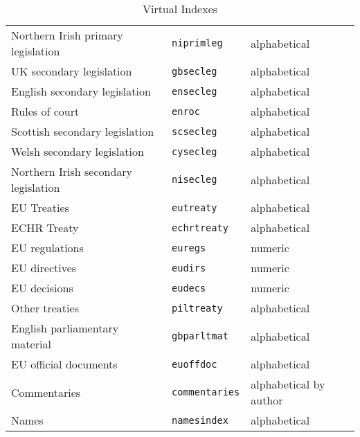 \documentclass[a4paper,
               11pt,
	       DIV=1,			   
	       footinclude=false]
	      {scrartcl}
\begin{document}
\begin{table}
\begin{tabular}{lll}
Northern Irish primary legislation   & \texttt{niprimleg}    & alphabetical \\
UK secondary legislation             & \texttt{gbsecleg}     & alphabetical \\
English secondary legislation        & \texttt{ensecleg}     & alphabetical \\
Rules of court                       & \texttt{enroc}        & alphabetical \\
Scottish secondary legislation       & \texttt{scsecleg}     & alphabetical \\
Welsh secondary legislation          & \texttt{cysecleg}     & alphabetical \\
Northern Irish secondary legislation & \texttt{nisecleg}     & alphabetical \\
EU Treaties                          & \texttt{eutreaty}     & alphabetical \\
ECHR Treaty                          & \texttt{echrtreaty}   & alphabetical \\
EU regulations                       & \texttt{euregs}       & numeric \\
EU directives                        & \texttt{eudirs}       & numeric \\
EU decisions                         & \texttt{eudecs}       & numeric \\
Other treaties                       & \texttt{piltreaty}    & alphabetical \\
English parliamentary material       & \texttt{gbparltmat}   & alphabetical \\
EU official documents                & \texttt{euoffdoc}     & alphabetical \\
Commentaries                         & \texttt{commentaries} & alphabetical 
                                                               by author \\
Names                                & \texttt{namesindex}   & alphabetical\\
\bottomrule
\end{tabular}
\caption{Virtual Indexes\label{categories}}
\end{table}
\end{document}

